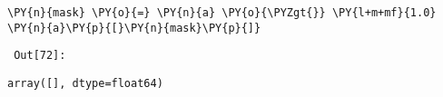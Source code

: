 {\par%
\vspace{-1\baselineskip}%
}%
\begin{notebookcell}[72]%
\begin{addmargin}[\cellleftmargin]{0em}%
{\smaller%
\par%
%
\vspace{-1\smallerfontscale}%
\begin{Verbatim}[commandchars=\\\{\}]
\PY{n}{mask} \PY{o}{=} \PY{n}{a} \PY{o}{\PYZgt{}} \PY{l+m+mf}{1.0}
\PY{n}{a}\PY{p}{[}\PY{n}{mask}\PY{p}{]}
\end{Verbatim}
%
\par%
\vspace{-1\smallerfontscale}}%
\end{addmargin}
\end{notebookcell}

\par\vspace{1\smallerfontscale}%
    
        {\par%
        \vspace{-1\smallerfontscale}%
        \noindent%
        \begin{minipage}{\cellleftmargin}%
    \hfill%
    {\smaller%
    \tt%
    \color{nbframe-out-prompt}%
    Out[72]:}%
    \hspace{\inputpadding}%
    \hspace{0em}%
    \hspace{3pt}%
    \end{minipage}%
        }%
    \begin{addmargin}[\cellleftmargin]{0em}%
    {\smaller%
    \vspace{-1\smallerfontscale}%
    
    
    
    \begin{verbatim}
array([], dtype=float64)
    \end{verbatim}

    
}%
    \end{addmargin}%

